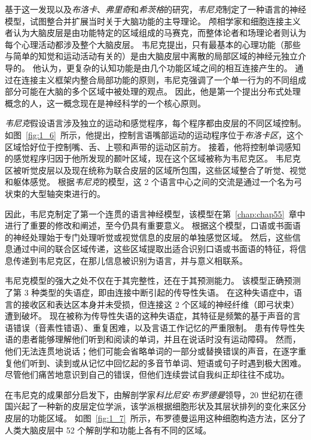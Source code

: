 基于这一发现以及\textit{布洛卡}、\textit{弗里奇}和\textit{希茨格}的研究，\textit{韦尼克}制定了一种语言的神经模型，试图整合并扩展当时关于大脑功能的主导理论。
颅相学家和细胞连接主义者认为大脑皮层是由功能特定的区域组成的马赛克，而整体论者和场理论者则认为每个心理活动都涉及整个大脑皮层。
韦尼克提出，只有最基本的心理功能（那些与简单的知觉和运动活动有关的）是由大脑皮层中离散的局部区域的神经元独立介导的。
他认为，更复杂的认知功能是由几个功能区域之间的相互连接产生的。
通过在连接主义框架内整合局部功能的原则，韦尼克强调了一个单一行为的不同组成部分可能在大脑的多个区域中被处理的观点。
因此，他是第一个提出分布式处理概念的人，这一概念现在是神经科学的一个核心原则。




\textit{韦尼克}假设语言涉及独立的运动和感觉程序，每个程序都由皮层的不同区域控制。
如图~\ref{fig:1_6}~所示，他提出，控制言语嘴部运动的运动程序位于\textit{布洛卡区}，这个区域恰好位于控制嘴、舌、上颚和声带的运动区前方。
接着，他将控制单词感知的感觉程序归因于他所发现的颞叶区域，现在这个区域被称为韦尼克区。
韦尼克区被听觉皮层以及现在统称为联合皮层的区域所包围，这些区域整合了听觉、视觉和躯体感觉。
根据\textit{韦尼克}的模型，这 2 个语言中心之间的交流是通过一个名为弓状束的大型轴突束进行的。



因此，韦尼克制定了第一个连贯的语言神经模型，该模型在第~\ref{chap:chap55}~章中进行了重要的修改和阐述，至今仍具有重要意义。
根据这个模型，口语或书面语的神经处理始于专门处理听觉或视觉信息的皮层的单独感觉区域。
然后，这些信息通过中间的联合区域传递，这些区域提取出适合识别口语或书面语的特征，将信息传递到韦尼克区，在那儿信息被识别为语言，并与意义相联系。




韦尼克模型的强大之处不仅在于其完整性，还在于其预测能力。
该模型正确预测了第 3 种类型的失语症，即由连接中断引起的传导性失语。
在这种失语症中，语言的接收区和表达区本身并未受损，但连接这 2 个区域的神经纤维（即弓状束）遭到破坏。
现在被称为传导性失语的这种失语症，其特征是频繁的基于声音的言语错误（音素性错语）、重复困难，以及言语工作记忆的严重限制。
患有传导性失语的患者能够理解他们听到和阅读的单词，并且在说话时没有运动障碍。
然而，他们无法连贯地说话；他们可能会省略单词的一部分或替换错误的声音，在逐字重复他们听到、读到或从记忆中回忆起的多音节单词、短语或句子时遇到极大困难。
尽管他们痛苦地意识到自己的错误，但他们连续尝试自我纠正却往往不成功。





在韦尼克的成果部分启发下，由解剖学家\textit{科比尼安$\cdot$布罗德曼}领导，20 世纪初在德国兴起了一种新的皮层定位学派，该学派根据细胞形状及其层状排列的变化来区分皮层的功能区域。
如图~\ref{fig:1_7}~所示，布罗德曼运用这种细胞构造方法，区分了人类大脑皮层中 52 个解剖学和功能上各有不同的区域。




